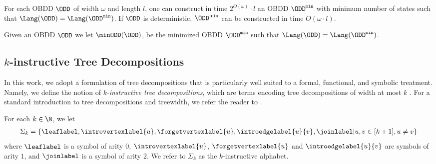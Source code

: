 \begin{theorem}\label{theorem:Minimize} 
For each OBDD $\ODD$ of width $\omega$ and length $l$, one can construct in time $2^{O(\omega)}\cdot l$ an OBDD $\ODD^{\texttt{min}}$ with minimum number of states such that $\Lang(\ODD) = \Lang(\ODD^{\texttt{min}})$. If $\ODD$ is deterministic, $\ODD^{\min}$ can be constructed in time $O(\omega\cdot l)$. 
\label{theorem:}
    
\end{theorem}

Given an OBDD $\ODD$ we let $\minODD(\ODD)$, be the minimized OBDD $\ODD^{\texttt{min}}$ such that $\Lang(\ODD) = \Lang(\ODD^{\texttt{min}})$.


\subsection{$k$-instructive Tree Decompositions}  In this work, we adopt a formulation of tree decompositions that is particularly
well suited to a formal, functional, and symbolic treatment.
Namely, we define the notion of $k$-\emph{instructive tree decompositions}, which are terms encoding tree decompositions of width at most $k$ \cite{From2023}. For a
standard introduction to tree decompositions and treewidth, we refer the reader
to \cite{BlueBook}.

\begin{definition}\label{def:InstructiveAlphabet}
For each $k \in \N$, we let
\begin{align}\nonumber
    \Sigma_k = \{\leaflabel, \introvertexlabel{u},\forgetvertexlabel{u},
    \introedgelabel{u}{v},\joinlabel| u,v\in [k+1],u\neq v\}
\end{align}
where $\leaflabel$ is a symbol of arity $0$, $\introvertexlabel{u}$, $\forgetvertexlabel{u}$ and $\introedgelabel{u}{v}$ are symbols of arity $1$, and $\joinlabel$ is a symbol of arity $2$. We refer to $\Sigma_k$ as the $k$-instructive alphabet.
\end{definition}

